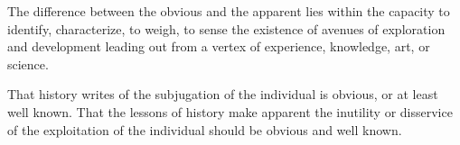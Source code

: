

The difference between the obvious and the apparent lies within the
capacity to identify, characterize, to weigh, to sense the existence
of avenues of exploration and development leading out from a vertex of
experience, knowledge, art, or science.

That history writes of the subjugation of the individual is obvious,
or at least well known.  That the lessons of history make apparent the
inutility or disservice of the exploitation of the individual should
be obvious and well known.

\bye
